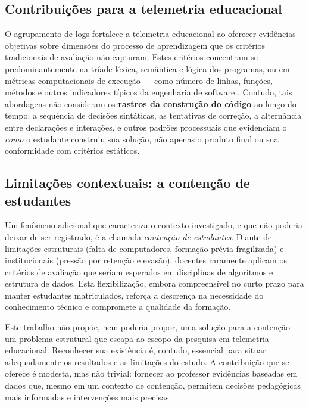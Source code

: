 \subsection{Contribuições para a telemetria educacional}

O agrupamento de logs fortalece a telemetria educacional ao oferecer evidências objetivas sobre dimensões do processo de aprendizagem que os critérios tradicionais de avaliação não capturam. Estes critérios concentram-se predominantemente na tríade léxica, semântica e lógica dos programas, ou em métricas computacionais de execução — como número de linhas, funções, métodos e outros indicadores típicos da engenharia de software \cite{pressman2021software, sommerville2019engineering}. Contudo, tais abordagens não consideram os \textbf{rastros da construção do código} ao longo do tempo: a sequência de decisões sintáticas, as tentativas de correção, a alternância entre declarações e interações, e outros padrões processuais que evidenciam o \textit{como} o estudante construiu sua solução, não apenas o produto final ou sua conformidade com critérios estáticos.

\subsection{Limitações contextuais: a contenção de estudantes}

Um fenômeno adicional que caracteriza o contexto investigado, e que não poderia deixar de ser registrado, é a chamada \textit{contenção de estudantes}. Diante de limitações estruturais (falta de computadores, formação prévia fragilizada) e institucionais (pressão por retenção e evasão), docentes raramente aplicam os critérios de avaliação que seriam esperados em disciplinas de algoritmos e estrutura de dados. Esta flexibilização, embora compreensível no curto prazo para manter estudantes matriculados, reforça a descrença na necessidade do conhecimento técnico e compromete a qualidade da formação.

Este trabalho não propõe, nem poderia propor, uma solução para a contenção — um problema estrutural que escapa ao escopo da pesquisa em telemetria educacional. Reconhecer sua existência é, contudo, essencial para situar adequadamente os resultados e as limitações do estudo. A contribuição que se oferece é modesta, mas não trivial: fornecer ao professor evidências baseadas em dados que, mesmo em um contexto de contenção, permitem decisões pedagógicas mais informadas e intervenções mais precisas.

